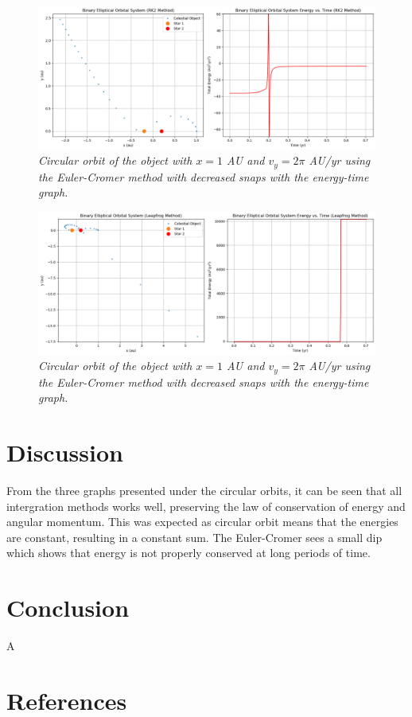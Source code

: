 \documentclass[11 pt, a4paper]{article}
\begin{document}
\begin{figure}[H]
  \includegraphics[width=0.7\linewidth]{binaryrk2elliptic.png}
  \centering
  \caption{\textit{Circular orbit of the object with $x = 1$ AU and $v_y = 2\pi$ AU/yr using the Euler-Cromer method with decreased snaps with the energy-time graph.}} 
\end{figure}

\begin{figure}[H]
  \includegraphics[width=0.7\linewidth]{binaryleapfrogelliptic.png}
  \centering
  \caption{\textit{Circular orbit of the object with $x = 1$ AU and $v_y = 2\pi$ AU/yr using the Euler-Cromer method with decreased snaps with the energy-time graph.}} 
\end{figure}

\section{Discussion}
From the three graphs presented under the circular orbits, it can be seen that all intergration methods works well, preserving the law of conservation of energy and angular momentum.
This was expected as circular orbit means that the energies are constant, resulting in a constant sum. The Euler-Cromer sees a small dip which shows that energy is not properly conserved at long periods of time.


\section{Conclusion}
A

\newpage
\section{References}  
\end{document}
